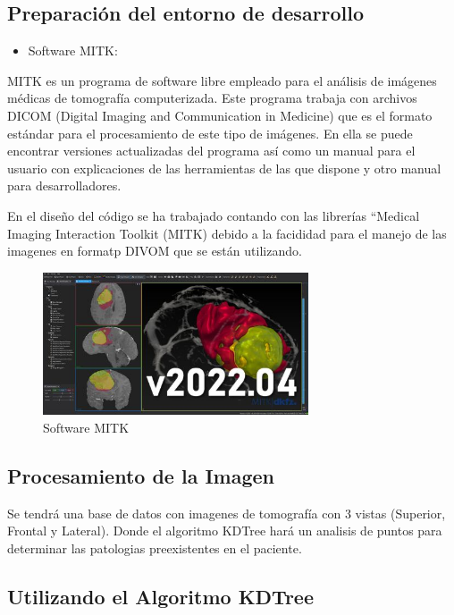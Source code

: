 \documentclass{article}
\begin{document}
\subsection{Preparación del entorno de desarrollo}


\begin{itemize}
            \item Software MITK:
\end{itemize}

MITK es un programa de software libre empleado para el análisis de imágenes médicas de
tomografía computerizada. Este programa trabaja con archivos DICOM (Digital Imaging and
Communication in Medicine) que es el formato estándar para el procesamiento de este tipo de
imágenes. En ella se puede encontrar versiones actualizadas del programa así como un manual para el usuario con explicaciones de las herramientas de las que dispone y otro manual para desarrolladores.

En el diseño del código se ha trabajado contando con las librerías “Medical Imaging Interaction Toolkit (MITK) debido a la facididad para el manejo de las imagenes en formatp DIVOM que se están utilizando.

\begin{figure}[H]
\centering
\includegraphics[width=0.7\textwidth]{img/MITK.jpg}
\caption{Software MITK}
\end{figure}

\subsection{Procesamiento de la Imagen}

Se tendrá una base de datos con imagenes de tomografía con 3 vistas (Superior, Frontal y Lateral). Donde el algoritmo KDTree hará un analisis de puntos para determinar las patologias preexistentes en el paciente.

\subsection{Utilizando el Algoritmo KDTree}
\end{document}
